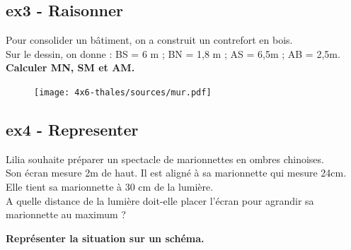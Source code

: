 \documentclass[12pt]{article}
\begin{document}
\begin{multicols}{3}
\subsection*{ex3 - Raisonner}
Pour consolider un bâtiment, on a construit un contrefort en bois. \\
Sur le dessin, on donne : BS = 6 m ; BN = 1,8 m ; AS = 6,5m ; AB = 2,5m.\\
\textbf{Calculer MN, SM et AM.}
\begin{figure}[H]
	\centering
	\texttt{[image: 4x6-thales/sources/mur.pdf]}
\end{figure}




\subsection*{ex4 - Representer}
Lilia souhaite préparer un spectacle de marionnettes en ombres chinoises. \\
Son écran mesure 2m de haut. Il est aligné à sa marionnette qui mesure 24cm.
Elle tient sa marionnette à 30 cm de la lumière.\\
A quelle distance de la lumière doit-elle placer l’écran pour agrandir sa marionnette au maximum ?

\textbf{Représenter la situation sur un schéma.}
\end{multicols}
\end{document}
